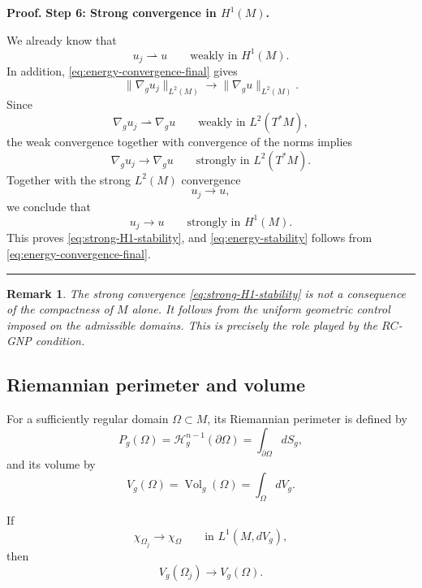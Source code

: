 \documentclass{article}
\renewcommand{\boxed}[1]{#1}
\newtheorem{remark}[theorem]{Remark}
\newenvironment{proof}[1][Proof]{\textbf{#1.} }{\ \rule{0.5em}{0.5em}}
\begin{document}
\begin{proof}
\medskip
\noindent
\textbf{Step 6: Strong convergence in $H^1(M)$.}

We already know that
\[
u_j\rightharpoonup u
\qquad\text{weakly in }H^1(M).
\]
In addition, \eqref{eq:energy-convergence-final} gives
\[
\|\nabla_g u_j\|_{L^2(M)}
\longrightarrow
\|\nabla_g u\|_{L^2(M)}.
\]
Since
\[
\nabla_g u_j\rightharpoonup\nabla_g u
\qquad\text{weakly in }L^2(T^*M),
\]
the weak convergence together with convergence of the norms implies
\[
\nabla_g u_j\longrightarrow\nabla_g u
\qquad\text{strongly in }L^2(T^*M).
\]
Together with the strong $L^2(M)$ convergence
\[
u_j\longrightarrow u,
\]
we conclude that
\[
\boxed{
u_j\longrightarrow u
\qquad\text{strongly in }H^1(M).
}
\]
This proves \eqref{eq:strong-H1-stability}, and
\eqref{eq:energy-stability} follows from
\eqref{eq:energy-convergence-final}.
\end{proof}
\begin{remark}
The strong convergence
\eqref{eq:strong-H1-stability} is not a consequence of the compactness
of $M$ alone. It follows from the uniform geometric control imposed on
the admissible domains. This is precisely the role played by the
$RC$-GNP condition.
\end{remark}

\subsection{Riemannian perimeter and volume}
\label{subsec:perimeter-volume}

For a sufficiently regular domain $\Omega\subset M$, its Riemannian
perimeter is defined by
\begin{equation}
P_g(\Omega)
=
\mathcal H_g^{n-1}(\partial\Omega)
=
\int_{\partial\Omega}dS_g,
\label{eq:Riemannian-perimeter}
\end{equation}
and its volume by
\begin{equation}
V_g(\Omega)
=
\operatorname{Vol}_g(\Omega)
=
\int_\Omega dV_g.
\label{eq:Riemannian-volume}
\end{equation}

If
\[
\chi_{\Omega_j}\to\chi_\Omega
\qquad\text{in }L^1(M,dV_g),
\]
then
\begin{equation}
V_g(\Omega_j)\longrightarrow V_g(\Omega).
\label{eq:volume-continuity}
\end{equation}
\end{document}
